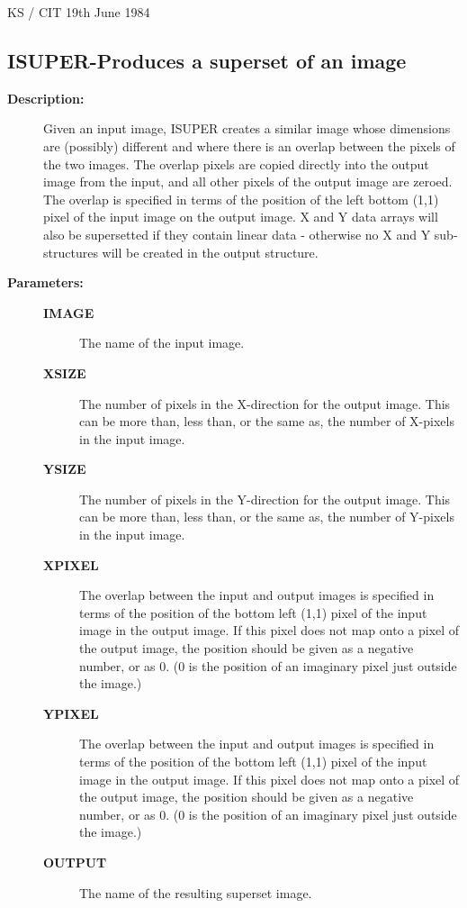\begin{description}
\begin{description}
\begin{terminalv}
                                  KS / CIT 19th June 1984
\end{terminalv}
\end{description}
\subsection{ISUPER-\label{ISUPER}Produces a superset of an image}
\begin{description}

\item [\textbf{Description:}]
 Given an input image, ISUPER creates a similar image whose
 dimensions are (possibly) different and where there is an
 overlap between the pixels of the two images.  The overlap
 pixels are copied directly into the output image from the
 input, and all other pixels of the output image are zeroed.
 The overlap is specified in terms of the position of the left
 bottom (1,1) pixel of the input image on the output image.
 X and Y data arrays will also be supersetted if they contain
 linear data - otherwise no X and Y sub-structures will be
 created in the output structure.

\item [\textbf{Parameters:}]
\begin{description}
\item [\textbf{IMAGE}]
 The name of the input image.
\item [\textbf{XSIZE}]
 The number of pixels in the X-direction for the
 output image.  This can be more than, less than,
 or the same as, the number of X-pixels in the
 input image.
\item [\textbf{YSIZE}]
 The number of pixels in the Y-direction for the
 output image.  This can be more than, less than,
 or the same as, the number of Y-pixels in the
 input image.
\item [\textbf{XPIXEL}]
 The overlap between the input and output images is specified
 in terms of the position of the bottom left (1,1) pixel
 of the input image in the output image.  If this pixel does
 not map onto a pixel of the output image, the position
 should be given as a negative number, or as 0.  (0 is the
 position of an imaginary pixel just outside the image.)
\item [\textbf{YPIXEL}]
 The overlap between the input and output images is specified
 in terms of the position of the bottom left (1,1) pixel
 of the input image in the output image.  If this pixel does
 not map onto a pixel of the output image, the position
 should be given as a negative number, or as 0.  (0 is the
 position of an imaginary pixel just outside the image.)
\item [\textbf{OUTPUT}]
 The name of the resulting superset image.
\end{description}


\end{description}
\end{description}
